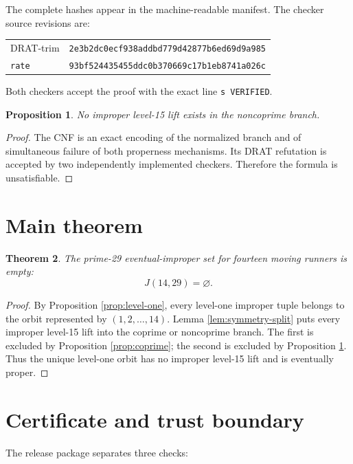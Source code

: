 \documentclass[11pt]{article}
\newtheorem{theorem}{Theorem}
\newtheorem{proposition}[theorem]{Proposition}
\begin{document}
The complete hashes appear in the machine-readable manifest.  The checker
source revisions are:
\begin{center}
\small
\begin{tabular}{ll}
DRAT-trim &
\texttt{2e3b2dc0ecf938addbd779d42877b6ed69d9a985}\\
\texttt{rate} &
\texttt{93bf524435455ddc0b370669c17b1eb8741a026c}\\
\end{tabular}
\end{center}
Both checkers accept the proof with the exact line
\texttt{s VERIFIED}.

\begin{proposition}
\label{prop:noncoprime}
No improper level-15 lift exists in the noncoprime branch.
\end{proposition}

\begin{proof}
The CNF is an exact encoding of the normalized branch and of simultaneous
failure of both properness mechanisms.  Its DRAT refutation is accepted by
two independently implemented checkers.  Therefore the formula is
unsatisfiable.
\end{proof}

\section{Main theorem}

\begin{theorem}
\label{thm:main}
The prime-29 eventual-improper set for fourteen moving runners is empty:
\[
  J(14,29)=\varnothing.
\]
\end{theorem}

\begin{proof}
By Proposition \ref{prop:level-one}, every level-one improper tuple belongs
to the orbit represented by \((1,2,\ldots,14)\).  Lemma
\ref{lem:symmetry-split} puts every improper level-15 lift into the coprime
or noncoprime branch.  The first is excluded by Proposition
\ref{prop:coprime}; the second is excluded by Proposition
\ref{prop:noncoprime}.  Thus the unique level-one orbit has no improper
level-15 lift and is eventually proper.
\end{proof}

\section{Certificate and trust boundary}

The release package separates three checks:
\end{document}
